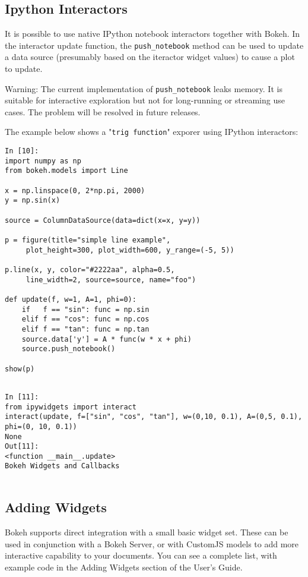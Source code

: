 \documentclass[a4paper,12pt]{article}
\begin{document}
\subsection{Ipython Interactors}
It is possible to use native IPython notebook interactors together with Bokeh. In the interactor update function, the \texttt{push\_notebook} method can be used to update a data source (presumably based on the iteractor widget values) to cause a plot to update.

Warning: The current implementation of \texttt{push\_notebook} leaks memory. It is suitable for interactive exploration but not for long-running or streaming use cases. The problem will be resolved in future releases.

The example below shows a "\texttt{trig function}" exporer using IPython interactors:

\begin{framed}
\begin{verbatim}
In [10]:
import numpy as np
from bokeh.models import Line

x = np.linspace(0, 2*np.pi, 2000)
y = np.sin(x)

source = ColumnDataSource(data=dict(x=x, y=y))

p = figure(title="simple line example", 
     plot_height=300, plot_width=600, y_range=(-5, 5))
     
p.line(x, y, color="#2222aa", alpha=0.5, 
     line_width=2, source=source, name="foo")

def update(f, w=1, A=1, phi=0):
    if   f == "sin": func = np.sin
    elif f == "cos": func = np.cos
    elif f == "tan": func = np.tan
    source.data['y'] = A * func(w * x + phi)
    source.push_notebook()

show(p)
\end{verbatim}
\end{framed}
\begin{framed}
	\begin{verbatim}
	
In [11]:
from ipywidgets import interact
interact(update, f=["sin", "cos", "tan"], w=(0,10, 0.1), A=(0,5, 0.1), phi=(0, 10, 0.1))
None
Out[11]:
<function __main__.update>
Bokeh Widgets and Callbacks
	
\end{verbatim}
\end{framed}

\subsection{Adding Widgets}
Bokeh supports direct integration with a small basic widget set. These can be used in conjunction with a Bokeh Server, or with CustomJS models to add more interactive capability to your documents. You can see a complete list, with example code in the Adding Widgets section of the User's Guide.
\end{document}
